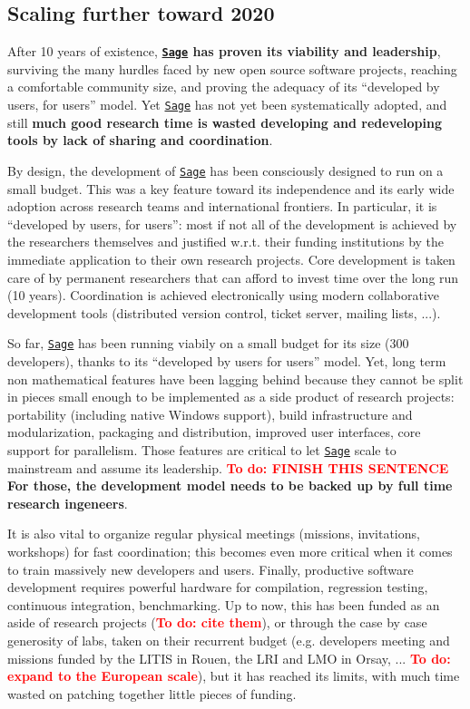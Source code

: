 \documentclass[a4,12pt]{amsart}
\newcommand{\sage}{\href{http://www.sagemath.org/}{\texttt{Sage}}\xspace}
\newcommand{\TODO}[2][To do: ]{{\textcolor{red}{\textbf{#1#2}}}}
\begin{document}
\subsection*{Scaling further toward 2020}

After 10 years of existence, \textbf{\sage has proven its viability
  and leadership}, surviving the many hurdles faced by new open source
software projects, reaching a comfortable community size, and proving
the adequacy of its ``developed by users, for users'' model.  Yet
\sage has not yet been systematically adopted, and still \textbf{much
  good research time is wasted developing and redeveloping tools by
  lack of sharing and coordination}.

By design, the development of \sage has been consciously designed to
run on a small budget. This was a key feature toward its independence
and its early wide adoption across research teams and international
frontiers. In particular, it is ``developed by users, for users'':
most if not all of the development is achieved by the researchers
themselves and justified w.r.t. their funding institutions by the
immediate application to their own research projects. Core development
is taken care of by permanent researchers that can afford to invest
time over the long run (10 years). Coordination is achieved
electronically using modern collaborative development tools
(distributed version control, ticket server, mailing lists, ...).

So far, \sage has been running viabily on a small budget for its size (300
developers), thanks to its ``developed by users for users'' model. Yet,
long term non mathematical features have been lagging behind because they cannot be
split in pieces small enough to be implemented as a side product of research
projects: portability (including native Windows support), build infrastructure
and modularization, packaging and distribution, improved user interfaces, core
support for parallelism. Those features are critical to let \sage scale to
mainstream and assume its leadership.
\TODO{FINISH THIS SENTENCE}
\textbf{For those, the
development model needs to be backed up by full time research
ingeneers}.

It is also vital to organize regular physical meetings (missions,
invitations, workshops) for fast coordination; this becomes even more
critical when it comes to train massively new developers and users.
Finally, productive software development requires powerful hardware for
compilation, regression testing, continuous integration,
benchmarking.
%
Up to now, this has been funded as an aside of research
projects (\TODO{cite them}), or through the case by case generosity of
labs, taken on their recurrent budget (e.g. developers meeting and
missions funded by the LITIS in Rouen, the LRI and LMO in Orsay,
... \TODO{expand to the European scale}), but it has reached its
limits, with much time wasted on patching together little pieces of
funding.
%
\end{document}
